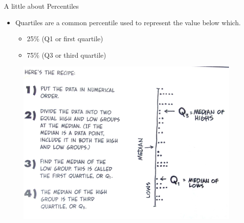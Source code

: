 \documentclass[
  ignorenonframetext,
]{beamer}
\providecommand{\tightlist}{%
  \setlength{\itemsep}{0pt}\setlength{\parskip}{0pt}}
\begin{document}
\begin{frame}{A little about Percentiles}
\label{a-little-about-percentiles}
\begin{itemize}
\tightlist
\item
  Quartiles are a common percentile used to represent the value below
  which.

  \begin{itemize}
  \tightlist
  \item
    25\% (Q1 or first quartile)\\
  \item
    75\% (Q3 or third quartile)
  \end{itemize}
\end{itemize}

\begin{figure}
\includegraphics[width=0.4\linewidth]{fig/quartiles} \end{figure}
\end{frame}
\end{document}
